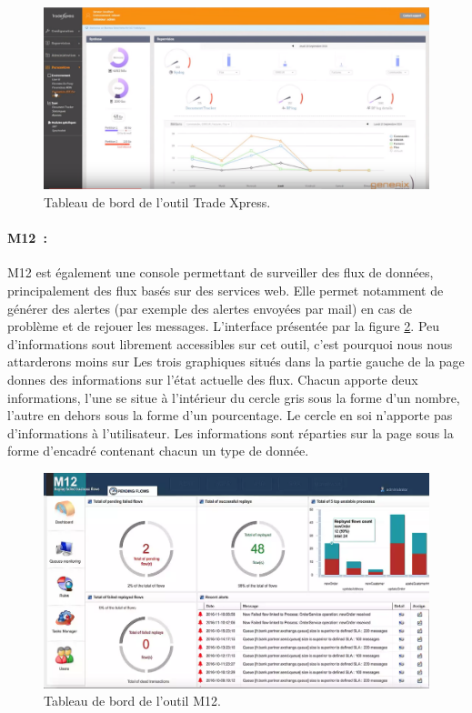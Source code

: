 			\begin{figure}[H]
				\centering
				\includegraphics[width=16cm]{../img/part2/trade_xpress.png}
				\caption{\label{trade_xpress} Tableau de bord de l'outil Trade Xpress.}
			\end{figure}
			
			\paragraph{M12~:}
			M12 est également une console permettant de surveiller des flux de données,
			principalement des flux basés sur des services web. Elle permet notamment de
			générer des alertes (par exemple des alertes envoyées par mail) en cas de
			problème et de rejouer les messages.\newline
			L'interface présentée par la figure \ref{m12}. Peu d'informations sout
			librement accessibles sur cet outil, c'est pourquoi nous nous attarderons
			moins sur Les trois graphiques situés dans la partie gauche de la page
			donnes des informations sur l'état actuelle des flux. Chacun apporte deux
			informations, l'une se situe à l'intérieur du cercle gris sous la forme d'un
			nombre, l'autre en dehors sous la forme d'un pourcentage. Le cercle en soi
			n'apporte pas d'informations à l'utilisateur.\newline
			Les informations sont réparties sur la page sous la forme d'encadré
			contenant chacun un type de donnée.
			\begin{figure}[H]
				\centering
				\includegraphics[width=16cm]{../img/part2/m12.png}
				\caption{\label{m12} Tableau de bord de l'outil M12.}
			\end{figure}
			
